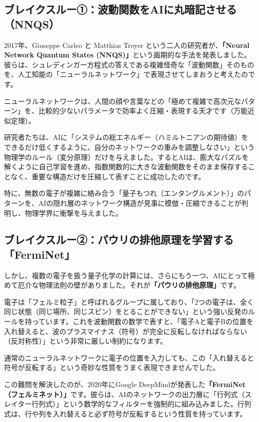 \subsection{ブレイクスルー①：波動関数をAIに丸暗記させる（NNQS）}

2017年、Giuseppe Carleo と Matthias Troyer という二人の研究者が、\textbf{「Neural Network Quantum States (NNQS)」}という画期的な手法を発表しました。彼らは、シュレディンガー方程式の答えである複雑怪奇な「波動関数」そのものを、人工知能の「ニューラルネットワーク」で表現させてしまおうと考えたのです。

ニューラルネットワークは、人間の顔や言葉などの「極めて複雑で高次元なパターン」を、比較的少ないパラメータで効率よく圧縮・表現する天才です（万能近似定理）。

研究者たちは、AIに「システムの総エネルギー（ハミルトニアンの期待値）をできるだけ低くするように、自分のネットワークの重みを調整しなさい」という物理学のルール（変分原理）だけを与えました。するとAIは、膨大なパズルを解くように自己学習を進め、指数関数的に大きな波動関数をそのまま保存することなく、重要な構造だけを圧縮して表すことに成功したのです。

特に、無数の電子が複雑に絡み合う「量子もつれ（エンタングルメント）」のパターンを、AIの隠れ層のネットワーク構造が見事に模倣・圧縮できることが判明し、物理学界に衝撃を与えました。

\subsection{ブレイクスルー②：パウリの排他原理を学習する「FermiNet」}

しかし、複数の電子を扱う量子化学の計算には、さらにもう一つ、AIにとって極めて厄介な物理法則の壁がありました。それが\textbf{「パウリの排他原理」}です。

電子は「フェルミ粒子」と呼ばれるグループに属しており、「2つの電子は、全く同じ状態（同じ場所、同じスピン）をとることができない」という強い反発のルールを持っています。これを波動関数の数学で表すと、「電子Aと電子Bの位置を入れ替えると、波のプラスマイナス（符号）が完全に反転しなければならない（反対称性）」という非常に厳しい制約になります。

通常のニューラルネットワークに電子の位置を入力しても、この「入れ替えると符号が反転する」という奇妙な性質をうまく表現できませんでした。

この難問を解決したのが、2020年にGoogle DeepMindが発表した\textbf{「FermiNet（フェルミネット）」}です。彼らは、AIのネットワークの出力層に「行列式（スレイター行列式）」という数学的なフィルターを強制的に組み込みました。行列式は、行や列を入れ替えると必ず符号が反転するという性質を持っています。

